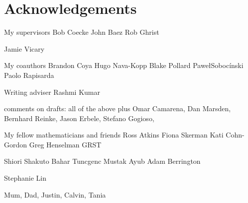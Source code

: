 \section*{Acknowledgements}

My supervisors
Bob Coecke
John Baez
Rob Ghrist

Jamie Vicary

My coauthors
Brandon Coya
Hugo Nava-Kopp
Blake Pollard
Pawe\l Soboc\'inski
Paolo Rapisarda

Writing adviser Rashmi Kumar

comments on drafts:
all of the above plus Omar Camarena, Dan Marsden, Bernhard Reinke, Jason Erbele, Stefano
Gogioso,

My fellow mathematicians and friends
Ross Atkins
Fiona Skerman
Kati Cohn-Gordon
Greg Henselman
GRST 

Shiori Shakuto
Bahar Tuncgenc
Mustak Ayub
Adam Berrington


Stephanie Lin

Mum, Dad, Justin, Calvin, Tania



